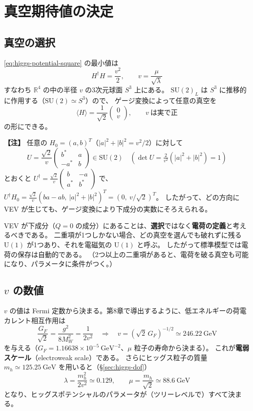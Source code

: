 \documentclass[uplatex,dvipdfmx,a4paper,11pt,openany]{jsbook}
\newcommand{\term}[2]{\textbf{#1}（#2）}
\newenvironment{note}{\vspace{1ex}\par\footnotesize\noindent\textbf{【注】}}{\par\vspace{1ex}}
\numberwithin{equation}{chapter}
\theoremstyle{definition}
\theoremstyle{plain}
\theoremstyle{remark}
\newcommand{\SU}{\mathrm{SU}}
\newcommand{\U}{\mathrm{U}}
\begin{document}
\section{真空期待値の決定}
\label{sec:vev-determination}
\subsection{真空の選択}
\eqref{eq:higgs-potential-square} の最小値は
\begin{equation}
H^\dagger H=\frac{v^2}{2},\qquad v=\frac{\mu}{\sqrt\lambda}
\end{equation}
すなわち $\mathbb R^4$ の中の半径 $v$ の3次元球面 $S^3$ 上にある。
$\SU(2)_L$ は $S^3$ に推移的に作用する（$\SU(2)\simeq S^3$）ので、
ゲージ変換によって任意の真空を
\begin{equation}
\boxed{\langle H\rangle=\frac{1}{\sqrt2}\begin{pmatrix}0\\ v\end{pmatrix},\qquad v\ \text{は実で正}}
\label{eq:H-vev}
\end{equation}
の形にできる。
\begin{note}
任意の $H_0=(a,b)^T$（$|a|^2+|b|^2=v^2/2$）に対して
\[
U=\frac{\sqrt2}{v}\begin{pmatrix}b^*&a\\ -a^*&b\end{pmatrix}\in\SU(2)\quad(\det U=\tfrac{2}{v^2}(|a|^2+|b|^2)=1)
\]
とおくと $U^\dagger=\frac{\sqrt2}{v}\begin{pmatrix}b&-a\\ a^*&b^*\end{pmatrix}$ で、$U^\dagger H_0=\frac{\sqrt2}{v}(ba-ab,\ |a|^2+|b|^2)^T=(0,\ v/\sqrt2)^T$。
したがって、どの方向に VEV が生じても、ゲージ変換により下成分の実数にそろえられる。
\end{note}
VEV が下成分（$Q=0$ の成分）にあることは、\textbf{選択}ではなく\textbf{電荷の定義}と考えるべきである。
二重項が1つしかない場合、どの真空を選んでも破れずに残る $\U(1)$ が1つあり、それを電磁気の $\U(1)$ と呼ぶ。
したがって標準模型では電荷の保存は自動的である。
（2つ以上の二重項があると、電荷を破る真空も可能になり、パラメータに条件がつく。）
\subsection{$v$ の数値}
$v$ の値は Fermi 定数から決まる。第8章で導出するように、低エネルギーの荷電カレント相互作用は
\begin{equation}
\frac{G_F}{\sqrt2}=\frac{g^2}{8M_W^2}=\frac{1}{2v^2}
\quad\Longrightarrow\quad
v=\left(\sqrt2\,G_F\right)^{-1/2}\simeq246.22\ \mathrm{GeV}
\label{eq:v-value}
\end{equation}
を与える（$G_F=1.16638\times10^{-5}\ \mathrm{GeV}^{-2}$、$\mu$ 粒子の寿命から決まる）。
これが\term{電弱スケール}{electroweak scale}である。
さらにヒッグス粒子の質量 $m_h\simeq125.25\ \mathrm{GeV}$ を用いると（\S\ref{sec:higgs-dof}）
\begin{equation}
\lambda=\frac{m_h^2}{2v^2}\simeq0.129,\qquad \mu=\frac{m_h}{\sqrt2}\simeq88.6\ \mathrm{GeV}
\end{equation}
となり、ヒッグスポテンシャルのパラメータが（ツリーレベルで）すべて決まる。
\end{document}
